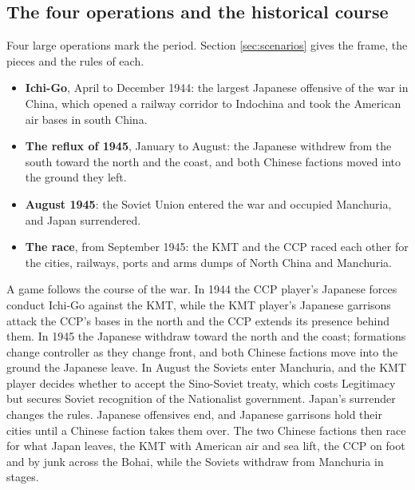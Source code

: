 \documentclass[11pt]{article}
\begin{document}
\subsection{The four operations and the historical course}\label{sub:course}
Four large operations mark the period. Section \ref{sec:scenarios} gives the frame, the pieces and the rules of each.
\begin{itemize}
\item \textbf{Ichi-Go}, April to December 1944: the largest Japanese offensive of the war in China, which opened a railway corridor to Indochina and took the American air bases in south China.
\item \textbf{The reflux of 1945}, January to August: the Japanese withdrew from the south toward the north and the coast, and both Chinese factions moved into the ground they left.
\item \textbf{August 1945}: the Soviet Union entered the war and occupied Manchuria, and Japan surrendered.
\item \textbf{The race}, from September 1945: the KMT and the CCP raced each other for the cities, railways, ports and arms dumps of North China and Manchuria.
\end{itemize}

A game follows the course of the war. In 1944 the CCP player's Japanese forces conduct Ichi-Go against the KMT, while the KMT player's Japanese garrisons attack the CCP's bases in the north and the CCP extends its presence behind them. In 1945 the Japanese withdraw toward the north and the coast; formations change controller as they change front, and both Chinese factions move into the ground the Japanese leave. In August the Soviets enter Manchuria, and the KMT player decides whether to accept the Sino-Soviet treaty, which costs Legitimacy but secures Soviet recognition of the Nationalist government. Japan's surrender changes the rules. Japanese offensives end, and Japanese garrisons hold their cities until a Chinese faction takes them over. The two Chinese factions then race for what Japan leaves, the KMT with American air and sea lift, the CCP on foot and by junk across the Bohai, while the Soviets withdraw from Manchuria in stages.
\end{document}
